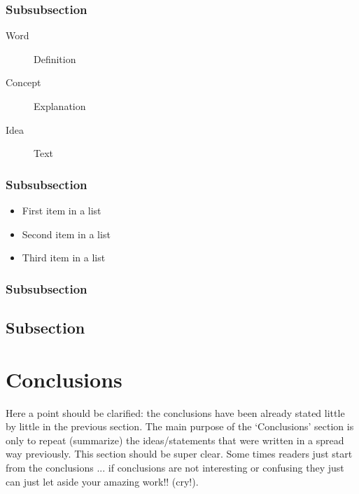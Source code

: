 \documentclass[fleqn,12pt]{NTFD} %
\begin{document}
\subsubsection{Subsubsection}

\lipsum[12] %

\begin{description}
\item[Word] Definition
\item[Concept] Explanation
\item[Idea] Text
\end{description}

\subsubsection{Subsubsection}

\lipsum[13] %

\begin{itemize}[noitemsep] %
\item First item in a list
\item Second item in a list
\item Third item in a list
\end{itemize}

\subsubsection{Subsubsection}

\lipsum[14] %

\subsection{Subsection}

\lipsum[15-23] %


\section{Conclusions} %

Here a point should be clarified: the conclusions have been already stated little by little in the previous section. The main purpose of the `Conclusions' section is only to repeat (summarize) the ideas/statements that were written in a spread way previously. This section should be super clear. Some times readers just start from the conclusions ... if conclusions are not interesting or confusing they just can just let aside your amazing work!! (cry!).
\end{document}
